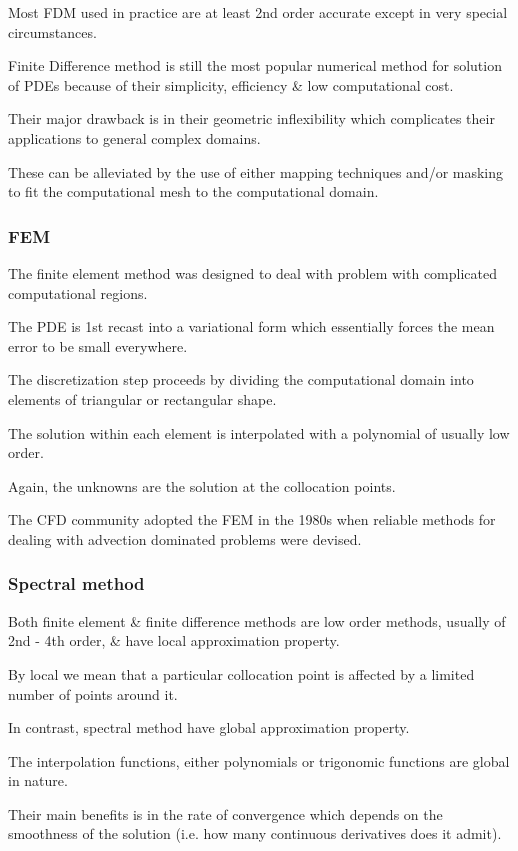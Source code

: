 \documentclass{article}
\begin{document}
Most FDM used in practice are at least 2nd order accurate except in very special circumstances.

Finite Difference method is still the most popular numerical method for solution of PDEs because of their simplicity, efficiency \& low computational cost.

Their major drawback is in their geometric inflexibility which complicates their applications to general complex domains.

These can be alleviated by the use of either mapping techniques and/or masking to fit the computational mesh to the computational domain. 

\subsubsection{FEM}
The finite element method was designed to deal with problem with complicated computational regions.

The PDE is 1st recast into a variational form which essentially forces the mean error to be small everywhere.

The discretization step proceeds by dividing the computational domain into elements of triangular or rectangular shape.

The solution within each element is interpolated with a polynomial of usually low order.

Again, the unknowns are the solution at the collocation points.

The CFD community adopted the FEM in the 1980s when reliable methods for dealing with advection dominated problems were devised.

\subsubsection{Spectral method}
Both finite element \& finite difference methods are low order methods, usually of 2nd - 4th order, \& have local approximation property.

By local we mean that a particular collocation point is affected by a limited number of points around it.

In contrast, spectral method have global approximation property.

The interpolation functions, either polynomials or trigonomic functions are global in nature.

Their main benefits is in the rate of convergence which depends on the smoothness of the solution (i.e. how many continuous derivatives does it admit).
\end{document}
